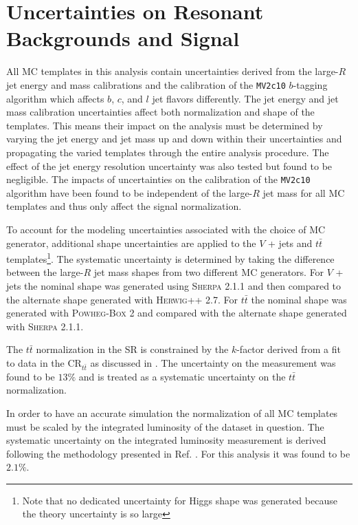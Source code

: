 \section{Uncertainties on Resonant Backgrounds and Signal} \label{sec:systematics:resonant_modeling}

All MC templates in this analysis contain uncertainties derived from the
large-$R$ jet energy and mass calibrations \cite{Aaboud:2018kfi} and the
calibration of the \texttt{MV2c10} $b$-tagging algorithm \cite{Aaboud:2018xwy}
which affects $b$, $c$, and $l$ jet flavors differently.  The jet energy and
jet mass calibration uncertainties affect both normalization and shape of the
templates.  This means their impact on the analysis must be determined by
varying the jet energy and jet mass up and down within their uncertainties and
propagating the varied templates through the entire analysis procedure.  The
effect of the jet energy resolution uncertainty was also tested but found to be
negligible. The impacts of uncertainties on the calibration of the
\texttt{MV2c10} algorithm have been found to be independent of the large-$R$
jet mass for all MC templates and thus only affect the signal normalization.

To account for the modeling uncertainties associated with the choice of MC
generator, additional shape uncertainties are applied to the $V$ + jets and
$t\bar{t}$ templates\footnote{Note that no dedicated uncertainty for Higgs
shape was generated because the theory uncertainty is so large}.  The
systematic uncertainty is determined by taking the difference between the
large-$R$ jet mass shapes from two different MC generators.  For $V$ + jets the
nominal shape was generated using \textsc{Sherpa} 2.1.1 and then compared to
the alternate shape generated with \textsc{Herwig}++ 2.7.  For $t\bar{t}$ the
nominal shape was generated with \textsc{Powheg-Box} 2 and compared with the
alternate shape generated with \textsc{Sherpa} 2.1.1.

The $t\bar{t}$ normalization in the SR is constrained by the $k$-factor derived
from a fit to data in the $\text{CR}_{t\bar{t}}$ as discussed in
.  The uncertainty on the measurement was found to
be $13\%$ and is treated as a systematic uncertainty on the $t\bar{t}$
normalization.

In order to have an accurate simulation the normalization of all MC templates
must be scaled by the integrated luminosity of the dataset in question.  The
systematic uncertainty on the integrated luminosity measurement is derived
following the methodology presented in Ref. \cite{Aad:2013ucp}.  For this
analysis it was found to be $2.1\%$.

